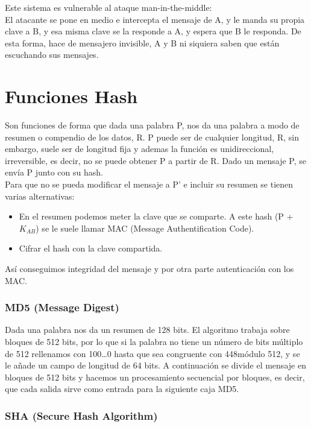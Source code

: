 \noindent
Este sistema es vulnerable al ataque man-in-the-middle:\\
El atacante se pone en medio e intercepta el mensaje de A, y le manda su propia clave a B, y esa misma clave se la responde a A, y espera que B le responda. De esta forma, hace de mensajero invisible, A y B ni siquiera saben que están escuchando sus mensajes. 

\section{Funciones Hash}

Son funciones de forma que dada una palabra P, nos da una palabra a modo de resumen o compendio de los datos, R. P puede ser de cualquier longitud, R, sin embargo, suele ser de longitud fija y ademas la función es unidireccional, irreversible, es decir, no se puede obtener P a partir de R. Dado un mensaje P, se envía P junto con su hash. \\

Para que no se pueda modificar el mensaje a P' e incluir su resumen se tienen varias alternativas: 
\begin{itemize}
    \item En el resumen podemos meter la clave que se comparte. A este hash (P + $K_{AB}$) se le suele llamar MAC (Message Authentification Code).
    \item Cifrar el hash con la clave compartida.
\end{itemize}

Así conseguimos integridad del mensaje y por otra parte autenticación con los MAC\@.

\subsubsection{MD5 (Message Digest)}

Dada una palabra nos da un resumen de 128 bits. El algoritmo trabaja sobre bloques de 512 bits, por lo que si la palabra no tiene un número de bits múltiplo de 512 rellenamos con 100\ldots0 hasta que sea congruente con 448módulo 512, y se le añade un campo de longitud de 64 bits. A continuación se divide el mensaje en bloques de 512 bits y hacemos un procesamiento secuencial por bloques, es decir, que cada salida sirve como entrada para la siguiente caja MD5\@.


\subsubsection{SHA (Secure Hash Algorithm)}

